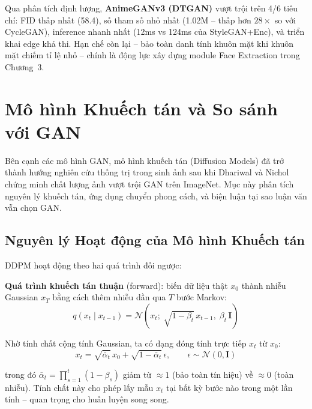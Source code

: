 Qua phân tích định lượng, \textbf{AnimeGANv3 (DTGAN)} vượt trội trên 4/6 tiêu chí: FID thấp nhất (58.4), số tham số nhỏ nhất (1.02M -- thấp hơn $28\times$ so với CycleGAN), inference nhanh nhất (12ms vs 124ms của StyleGAN+Enc), và triển khai edge khả thi. Hạn chế còn lại -- bảo toàn danh tính khuôn mặt khi khuôn mặt chiếm tỉ lệ nhỏ -- chính là động lực xây dựng module Face Extraction trong Chương~3.

\section{Mô hình Khuếch tán và So sánh với GAN}
\label{sec:diffusion_models}

Bên cạnh các mô hình GAN, mô hình khuếch tán (Diffusion Models) đã trở thành hướng nghiên cứu thống trị trong sinh ảnh sau khi Dhariwal và Nichol \cite{Dhariwal2021} chứng minh chất lượng ảnh vượt trội GAN trên ImageNet. Mục này phân tích nguyên lý khuếch tán, ứng dụng chuyển phong cách, và biện luận tại sao luận văn vẫn chọn GAN.

\subsection{Nguyên lý Hoạt động của Mô hình Khuếch tán}
\label{subsec:diffusion_principle}

DDPM \cite{Ho2020} hoạt động theo hai quá trình đối ngược:

\textbf{Quá trình khuếch tán thuận} (forward): biến dữ liệu thật $x_0$ thành nhiễu Gaussian $x_T$ bằng cách thêm nhiễu dần qua $T$ bước Markov:
\begin{equation}
\label{eq:forward_diffusion}
q(x_t \mid x_{t-1}) = \mathcal{N}\!\left(x_t;\; \sqrt{1 - \beta_t}\,x_{t-1},\; \beta_t\, \mathbf{I}\right)
\end{equation}

Nhờ tính chất cộng tính Gaussian, ta có dạng đóng tính trực tiếp $x_t$ từ $x_0$:
\begin{equation}
\label{eq:forward_closed}
x_t = \sqrt{\bar{\alpha}_t}\,x_0 + \sqrt{1 - \bar{\alpha}_t}\,\epsilon, \qquad \epsilon \sim \mathcal{N}(0, \mathbf{I})
\end{equation}

\noindent trong đó $\bar{\alpha}_t = \prod_{s=1}^{t}(1-\beta_s)$ giảm từ $\approx 1$ (bảo toàn tín hiệu) về $\approx 0$ (toàn nhiễu). Tính chất này cho phép lấy mẫu $x_t$ tại bất kỳ bước nào trong một lần tính -- quan trọng cho huấn luyện song song.

